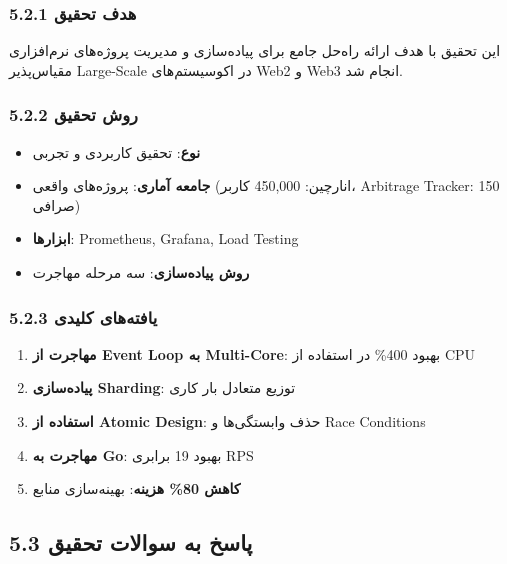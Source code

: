 \documentclass[
]{article}
\providecommand{\tightlist}{%
  \setlength{\itemsep}{0pt}\setlength{\parskip}{0pt}}
\begin{document}
\subsubsection{5.2.1 هدف
تحقیق}\label{ux647ux62fux641-ux62aux62dux642ux6ccux642}

این تحقیق با هدف ارائه راه‌حل جامع برای پیاده‌سازی و مدیریت پروژه‌های
نرم‌افزاری مقیاس‌پذیر Large-Scale در اکوسیستم‌های Web2 و Web3 انجام شد.

\subsubsection{5.2.2 روش
تحقیق}\label{ux631ux648ux634-ux62aux62dux642ux6ccux642}

\begin{itemize}
\tightlist
\item
  \textbf{نوع}: تحقیق کاربردی و تجربی
\item
  \textbf{جامعه آماری}: پروژه‌های واقعی (انارچین: 450,000 کاربر،
  Arbitrage Tracker: 150 صرافی)
\item
  \textbf{ابزارها}: Prometheus, Grafana, Load Testing
\item
  \textbf{روش پیاده‌سازی}: سه مرحله مهاجرت
\end{itemize}

\subsubsection{5.2.3 یافته‌های
کلیدی}\label{ux6ccux627ux641ux62aux647ux647ux627ux6cc-ux6a9ux644ux6ccux62fux6cc-1}

\begin{enumerate}
\def\labelenumi{\arabic{enumi}.}
\tightlist
\item
  \textbf{مهاجرت از Event Loop به Multi-Core}: بهبود 400\% در استفاده از
  CPU
\item
  \textbf{پیاده‌سازی Sharding}: توزیع متعادل بار کاری
\item
  \textbf{استفاده از Atomic Design}: حذف وابستگی‌ها و Race Conditions
\item
  \textbf{مهاجرت به Go}: بهبود 19 برابری RPS
\item
  \textbf{کاهش 80\% هزینه}: بهینه‌سازی منابع
\end{enumerate}

\subsection{5.3 پاسخ به سوالات
تحقیق}\label{ux67eux627ux633ux62e-ux628ux647-ux633ux648ux627ux644ux627ux62a-ux62aux62dux642ux6ccux642-1}
\end{document}
